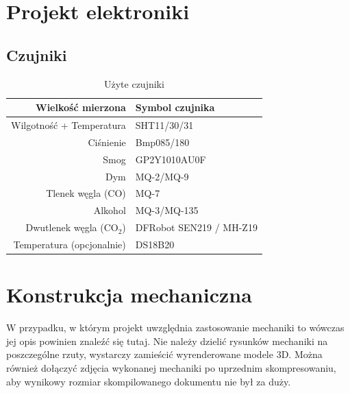 \documentclass[10pt, a4paper]{article}
\begin{document}
\section{Projekt elektroniki}
	\subsection{Czujniki}
	\begin{table}[H]
		\centering
		\begin{tabular}{|r|l|} \hline
			\textbf{Wielkość mierzona} & \textbf{Symbol czujnika} \\
			\hline
			Wilgotność + Temperatura & SHT11/30/31 \\
			Ciśnienie & Bmp085/180 \\
			Smog & GP2Y1010AU0F \\
			Dym & MQ-2/MQ-9 \\
			Tlenek węgla (CO) & MQ-7 \\
			Alkohol & MQ-3/MQ-135 \\
			Dwutlenek węgla (CO$_2$) & DFRobot SEN219 / MH-Z19 \\
			Temperatura (opcjonalnie) &	DS18B20 \\ \hline
		\end{tabular}
		\caption{Użyte czujniki}
		\label{tab:Czujniki}
	\end{table}

\section{Konstrukcja mechaniczna}

W przypadku, w którym projekt uwzględnia zastosowanie 
mechaniki to wówczas jej opis powinien znaleźć się tutaj.
Nie należy dzielić rysunków mechaniki na poszczególne rzuty, 
wystarczy zamieścić wyrenderowane modele 3D.
Można również dołączyć zdjęcia wykonanej 
mechaniki po uprzednim skompresowaniu, aby wynikowy rozmiar 
skompilowanego dokumentu nie był za duży.
\end{document}

